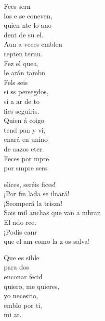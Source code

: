 \documentclass[12pt]{article}
\begin{document}
\begin{multicols*}{2}
\begin{cancion}
	Fees sern\\
	los e se coneven,\\
	quien nte lo ano\\
	dent de su el.\\
	Aun a veces emblen\\
	repten ternu.\\
	Fez el quea,\\
	le arán tambn\\
	Fels seis \\
	si ss persegdos,\\
	si a ar de to\\
	fies seguiris.\\
	Quien á coigo\\
	tend pan y vi,  \\
	enará en unino\\
	de aazos eter.\\
	Feces por mpre\\
	por smpre sers.\\
	\begin{chorus}%
	elices, seréis fices!\\
	¡Por fin lada se ilnará!\\
	¡Seomperá la trisza!\\
	Sois mil anchas que van a mbrar.\\
	El ndo ree.\\
	¡Podis canr\\
	que el am como la z os salva!\\
	\end{chorus}%
	Que es sible\\
	para dos \\
	enconar fecid\\
	quiero, me quieres,\\
	yo  necesito,\\
	emblo por ti,\\
	mi ar.\\
\end{cancion}%


\end{multicols*}
\end{document}
